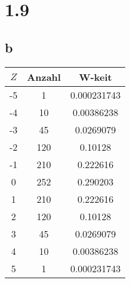 \documentclass{article}
\begin{document}
    \section*{1.9}
        \subsection*{b}
            \begin{tabular}{c|c|c}
                \textbf{$Z$}&\textbf{Anzahl}&\textbf{W-keit}\\
                \hline
                -5&1&0.000231743\\
                -4&10&0.00386238\\
                -3&45&0.0269079\\
                -2&120&0.10128\\
                -1&210&0.222616\\
                0&252&0.290203\\
                1&210&0.222616\\
                2&120&0.10128\\
                3&45&0.0269079\\
                4&10&0.00386238\\
                5&1&0.000231743
            \end{tabular}
\end{document}

